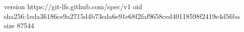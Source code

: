 version https://git-lfs.github.com/spec/v1
oid sha256:1eda36186ce9a2715d4b73eda6e91e68f2faf9658ced40118598f2419e4d56ba
size 87544
